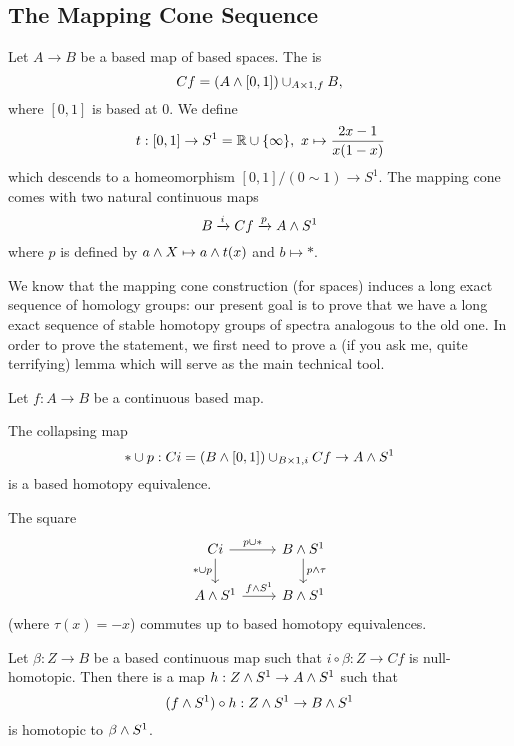 \subsection{The Mapping Cone Sequence}

\begin{construction}
Let $A\to B$ be a based map of based spaces. The  is \[Cf=(A\wedge[0,1])\cup_{A\times1,f}B,\]
where $[0,1]$ is based at $0$. We define 
\[t:[0,1]\to S^1={\mathbb R}\cup\{\infty\},\ x\mapsto\frac{2x-1}{x(1-x)}\]
which descends to a homeomorphism $[0,1]/(0\sim1)\to S^1$. The mapping cone comes with two natural continuous maps
\[B\xrightarrow{i}Cf\xrightarrow{p}A\wedge S^1\]
where $p$ is defined by $a\wedge X\mapsto a\wedge t(x)$ and $b\mapsto*$.
\end{construction}

We know that the mapping cone construction (for spaces) induces a long exact sequence of homology groups: our present goal is to prove that we have a long exact sequence of stable homotopy groups of spectra analogous to the old one. In order to prove the statement, we first need to prove a (if you ask me, quite terrifying) lemma which will serve as the main technical tool.

\begin{lemma}\label{lemma:technical-lemma-mapping-cone}
Let $f:A\to B$ be a continuous based map.
\begin{rmnumerate}
    \item The collapsing map
    \[*\cup p:Ci=(B\wedge[0,1])\cup_{B\times1,i}Cf\to A\wedge S^1\]
    is a based homotopy equivalence.
    \item The square
    \[
    \begin{tikzcd}
    Ci \ar[d,"*\cup p"'] \ar[r,"p\cup*"] & B\smsh S^1 \ar[d,"p\smsh\tau"]\\
    A\smsh S^1 \ar[r,"f\smsh S^1"] & B\smsh S^1
    \end{tikzcd}
    \]
    (where $\tau(x)=-x$) commutes up to based homotopy equivalences.
    \item Let $\beta:Z\to B$ be a based continuous map such that $i\circ\beta:Z\to Cf$ is null-homotopic. Then there is a map $h:Z\wedge S^1\to A\wedge S^1$ such that
    \[(f\wedge S^1)\circ h:Z\wedge S^1\to B\wedge S^1\]
    is homotopic to $\beta\wedge S^1$.
\end{rmnumerate}
\end{lemma}

